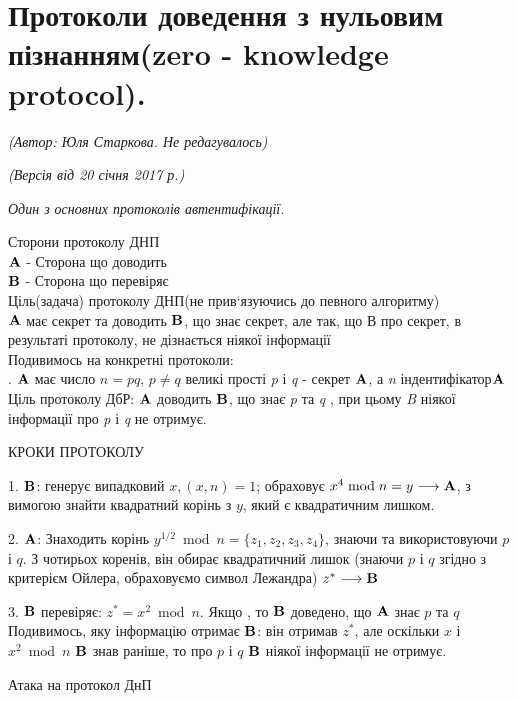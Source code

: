 %

\section{Протоколи доведення з нульовим пізнанням(zero - knowledge protocol).}
\begin{flushright}
\emph{(Автор: Юля Старкова. Не редагувалось)}
\par \emph{(Версія від 20 січня 2017 р.)}
\end{flushright}


\begin{center}
\textit{Один з основних протоколів автентифікації.}\\
\end{center}
Сторони протоколу ДНП\\
$\bold{A}$ - Сторона що доводить\\
$\bold{B}$ - Сторона що перевіряє\\

Ціль(задача) протоколу ДНП(не прив`язуючись до певного алгоритму)\\

$\bold{A}$ має секрет та доводить $\bold{B}$, що знає секрет, але так, що В про секрет, в результаті протоколу, не дізнається ніякої інформації\\
Подивимось на конкретні протоколи:\\

. $\bold{A}$ має число $n = pq$,  $p\neq q$ великі прості \textsl{p} і \textsl{q} - секрет $\bold{A}$, а \textsl{n} \glqq індентифікатор\grqq $\bold{A}$\\
Ціль протоколу ДбР: $\bold{A}$ доводить $\bold{B}$, що знає \textsl{p} та \textsl{q} , при цьому \textsl{B} ніякої інформації про \textsl{p} і \textsl{q} не отримує.\\

\begin{center} 
КРОКИ ПРОТОКОЛУ
\end{center}

1. $\bold{B}$: генерує випадковий $x, (x,n) = 1$; 
обраховує $  x^4\bmod{n} = y \longrightarrow \bold{A}$, з вимогою знайти квадратний корінь з $y$, який є квадратичним лишком.
\par2. $\bold{A}$: Знаходить корінь $y^{1/2}\bmod n=\{z_1, z_2, z_3, z_4\} $, знаючи та використовуючи $p$ і $q$. З  чотирьох коренів, він обирає квадратичний лишок (знаючи $p$ і $q$ згідно з критерієм Ойлера, обраховуємо символ Лежандра) $z^* \longrightarrow \bold{B}$
\par3. $\bold{B}$  перевіряє: $z^* = x^2\bmod n$. Якщо \grqq, то $\bold{B}$ доведено, що $\bold{A}$ знає $p$ та $q$\\
Подивимось, яку інформацію отримає $\bold{B}$: він отримав $z^*$, але оскільки $x$ і $x^2\bmod n$ $\bold{B}$ знав раніше, то про $p$ і $q$ $\bold{B}$ ніякої інформації не отримує.\\
\begin{center}
Атака на протокол ДнП 
\end{center}

